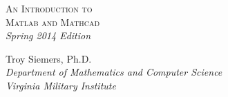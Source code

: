 \begin{flushright}

\textsc{\huge An Introduction to } \\
\vspace{.2in}
\textsc{\huge Matlab and Mathcad} \\
\vspace{.2in}
\textsl{Spring 2014 Edition} 

\Large
\vspace{1in}

Troy Siemers, Ph.D.\\

\emph{\small Department of Mathematics and Computer Science}\\

\emph{\small Virginia Military Institute}

\normalsize
\end{flushright}


